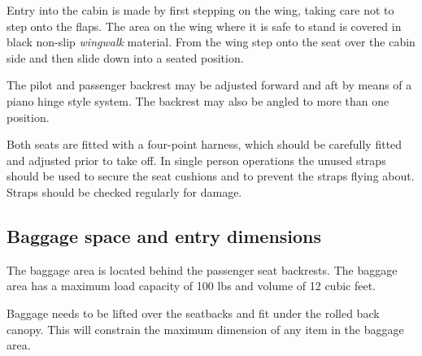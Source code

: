 Entry into the cabin is made by first stepping on the wing, taking care not to step onto the flaps.  The area on the wing where it is safe to stand is covered in black non-slip \textit{wingwalk} material.  From the wing step onto the seat over the cabin side and then slide down into a seated position.

The pilot and passenger backrest may be adjusted forward and aft by means of a piano hinge style system.  The backrest may also be angled to more than one position. 

Both seats are fitted with a four-point harness, which should be carefully fitted and adjusted prior to take off. In single person operations the unused straps should be used to secure the seat cushions and to prevent the straps flying about.
Straps should be checked regularly for damage.

\subsection{Baggage space and entry dimensions}
The baggage area is located behind the passenger seat backrests.  The baggage area has a maximum load capacity of 100 lbs and volume of 12 cubic feet.  

Baggage needs to be lifted over the seatbacks and fit under the rolled back canopy.  This will constrain the maximum dimension of any item in the baggage area.

